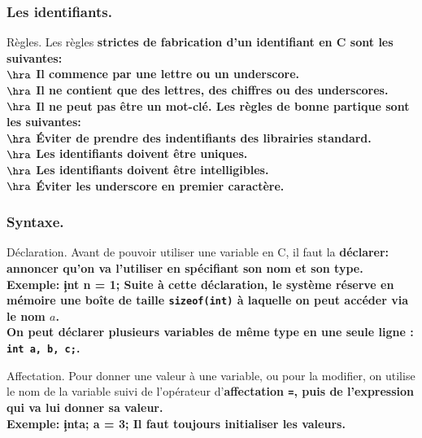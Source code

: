 \documentclass[french, 11pt]{article}
\begin{document}
\vspace*{-0.7cm}

\subsubsection{Les identifiants.}

\begin{defi}{Règles.}{}
    Les règles \bf{strictes} de fabrication d'un identifiant en C sont les suivantes:\\
    $\hra$ Il commence par une lettre ou un underscore.\\
    $\hra$ Il ne contient que des lettres, des chiffres ou des underscores.\\
    $\hra$ Il ne peut pas être un mot-clé.\n
    Les règles de \bf{bonne partique} sont les suivantes:\\
    $\hra$ Éviter de prendre des indentifiants des librairies standard.\\
    $\hra$ Les identifiants doivent être uniques.\\
    $\hra$ Les identifiants doivent être intelligibles.\\
    $\hra$ Éviter les underscore en premier caractère.
\end{defi}

\vspace*{-0.7cm}

\subsubsection{Syntaxe.}

\begin{defi}{Déclaration.}{}
    Avant de pouvoir utiliser une variable en C, il faut la \bf{déclarer}: annoncer qu'on va l'utiliser en spécifiant son nom et son type.\\
    \bf{Exemple:} \c{int n = 1;}\n
    Suite à cette déclaration, le système réserve en mémoire une boîte de taille \texttt{sizeof(int)} à laquelle on peut accéder via le nom $a$.\\
    On peut déclarer plusieurs variables de même type en une seule ligne : \texttt{int a, b, c;}.
\end{defi}

\vspace*{-0.7cm}

\begin{defi}{Affectation.}{}
    Pour donner une valeur à une variable, ou pour la modifier, on utilise le nom de la variable suivi de l'opérateur d'\bf{affectation} \texttt{=}, puis de l'expression qui va lui donner sa valeur.\\
    \bf{Exemple:} \c{int{a; a = 3;}}\n
    Il faut \bf{toujours} initialiser les valeurs.
\end{defi}
\end{document}
